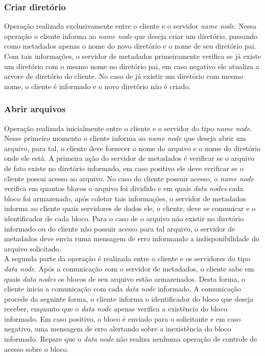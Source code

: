 	\subsubsection{Criar diretório}
	
	Operação realizada exclusivamente entre o cliente e o servidor \textit{name node}. Nessa operação o cliente informa ao \textit{name node} que deseja criar um diretório, passando como metadados apenas o nome do novo diretório e o nome de seu diretório pai. Com tais informações, o servidor de metadados primeiramente verifica se já existe um diretório com o mesmo nome no diretório pai, em caso negativo ele atualiza a arvore de diretório do cliente. No caso de já existir um diretório com mesmo nome, o cliente é informado e o novo diretório não é criado.
	\\
	
	\subsubsection{Abrir arquivos}
	
	Operação realizada inicialmente entre o cliente e o servidor do tipo \textit{name node}. Nesse primeiro momento o cliente informa ao \textit{name node} que deseja abrir um arquivo, para tal, o cliente deve fornecer o nome do arquivo e o nome do diretório onde ele está. A primeira ação do servidor de metadados é verificar se o arquivo de fato existe no diretório informado, em caso positivo ele deve verificar se o cliente possui acesso ao arquivo. No caso do cliente possuir acesso, o \textit{name node} verifica em quantos blocos o arquivo foi dividido e em quais \textit{data nodes} cada bloco foi armazenado, após coletar tais informações, o servidor de metadados informa ao cliente quais servidores de dados ele, o cliente, deve se comunicar e o identificador de cada bloco. Para o caso de o arquivo não existir no diretório informado ou do cliente não possuir acesso para tal arquivo, o servidor de metadados deve envia ruma mensagem de erro informando a indisponibilidade do arquivo solicitado. 
	\\
	
	A segunda parte da operação é realizada entre o cliente e os servidores do tipo \textit{data node}. Após a comunicação com o servidor de metadados, o cliente sabe em quais \textit{data nodes} os blocos de seu arquivo estão armazenados. Desta forma, o cliente inicia a comunicação com cada \textit{data node} informado. A comunicação procede da seguinte forma, o cliente informa o identificador do bloco que deseja receber, enquanto que o \textit{data node} apenas verifica a existência do bloco informado. Em caso positivo, o bloco é enviado para o solicitante e em caso negativo, uma mensagem de erro alertando sobre a inexistência do bloco informado. Repare que o \textit{data node} não realiza nenhuma operação de controle de acesso sobre o bloco.
	\\
	
